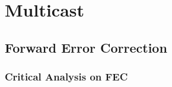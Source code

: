 \section{Multicast}

\subsection{Forward Error Correction}

\subsubsection*{Critical Analysis on FEC}
